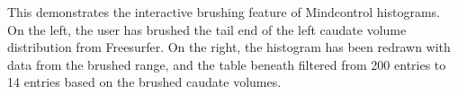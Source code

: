 \label{fig:brush}
This demonstrates the interactive brushing feature of Mindcontrol histograms. On the left, the user has brushed the tail end of the left caudate volume distribution from Freesurfer. On the right, the histogram has been redrawn with data from the brushed range, and the table beneath filtered from 200 entries to 14 entries based on the brushed caudate volumes.